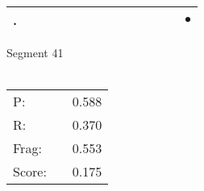 \documentclass[landscape]{article}
\newcommand{\ssp}{\hspace{2pt}}
\newcommand{\mex}{\cellcolor{g}$\bullet$}
\begin{document}
\begin{tabular}{|l|p{10pt}|p{10pt}|p{10pt}|p{10pt}|p{10pt}|p{10pt}|p{10pt}|p{10pt}|p{10pt}|p{10pt}|p{10pt}|p{10pt}|p{10pt}|}
\hline
\ssp \cellcolor{ref12}. \ssp&\hspace{2pt}&\hspace{2pt}&\hspace{2pt}&\hspace{2pt}&\hspace{2pt}&\hspace{2pt}&\hspace{2pt}&\hspace{2pt}&\hspace{2pt}&\hspace{2pt}&\hspace{2pt}&\hspace{2pt}&\hspace{2pt}\mex\\
\hline
\end{tabular}

\vspace{6pt}
\noindent Segment 41\\\\
\noindent\begin{tabular}{lm{12pt}r}
\hline
P:&&0.588\\
R:&&0.370\\
Frag:&&0.553\\
Score:&&0.175\\
\end{tabular}

\newpage
\end{document}
